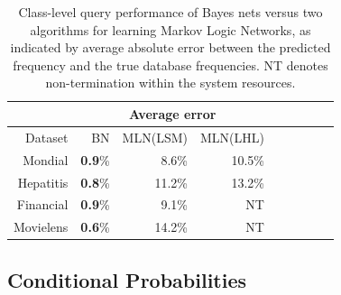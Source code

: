 \documentclass[oribibl]{llncs}
\begin{document}
\begin{table}[thbp] \centering
\caption{Class-level query performance of Bayes nets versus two algorithms for learning Markov Logic Networks, as indicated by average absolute error between the predicted frequency and the true database frequencies.
 NT denotes non-termination within the system resources. %
}
\begin{tabular}{|r|r|r|r|r|r|r|r|r|}
\hline & \multicolumn{3}{|c|}{Average error}\\
\hline
    Dataset & BN & MLN(LSM) & MLN(LHL)\\
\hline
    Mondial &\textbf{0.9}\% & 8.6\% &10.5\% \\
    Hepatitis &\textbf{ 0.8}\% & 11.2\% & 13.2\%\\
    Financial & \textbf{0.9}\% & 9.1\% & NT\\
    Movielens  &\textbf{0.6}\% & 14.2\% & NT\\
\hline
\end{tabular}
\label{table:mln-results}
\end{table}


\subsection{Conditional Probabilities}\label{sec:conditional-probabilities}
\end{document}
